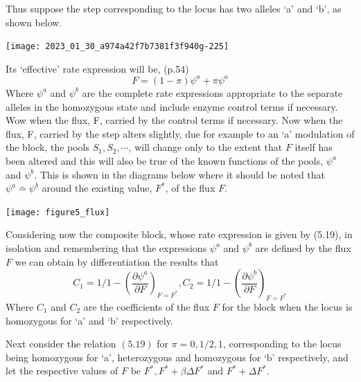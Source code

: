 Thus suppose the step corresponding to the locus has two alleles `a' and `b', as shown below.

\begin{center}
\texttt{[image: 2023\_01\_30\_a974a42f7b7381f3f940g-225]}
\end{center}

Its `effective' rate expression will be, (p.54)
%
\begin{equation}
F = (1 - \pi)\psi^a + \pi \psi^a
\label{eqn:519}
\end{equation}
%
Where $\psi^{a}$ and $\psi^{b}$ are the complete rate expressions appropriate to the separate alleles in the homozygous state and include enzyme control terms if necessary. Wow when the flux, F, carried by the control terms if necessary. Now when the flux, F, carried by the step alters slightly, due for example to an `a' modulation of the block, the pools $S_{1}, S_{2}, \cdots$, will change only to the extent that $F$ itself has been altered and this will also be true of the known functions of the pools, $\psi^{a}$ and $\psi^{b}$. This is shown in the diagrams below where it should be noted that $\psi^{a} \bumpeq \psi^{b}$ around the existing value, $F^{*}$, of the flux $F$.

\texttt{[image: figure5\_flux]}

Considering now the composite block, whose rate expression is given by (5.19), in isolation and remembering that the expressions $\psi^{a}$ and $\psi^{b}$ are defined by the flux $F$ we can obtain by differentiation the results that
%
\begin{equation}
C_{1}=1 / 1-\left(\frac{\partial \psi^{a}}{\partial F}\right)_{F=F^{*}}, C_{2}=1 / 1-\left(\frac{\partial \psi^{b}}{\partial F}\right)_{F=F^*} \tag{i}
\label{eqn:520a}
\end{equation}
%
Where $C_{1}$ and $C_{2}$ are the coefficients of the flux $F$ for the block when the locus is homozygous for `a' and `b' respectively.

Next consider the relation $(5.19)$ for $\pi=0,1 / 2,1$, corresponding to the locus being homozygous for `a', heterozygous and homozygous for `b' respectively, and let the respective values of $F$ be $F^{*}, F^{*}+\beta \Delta F^{*}$ and $F^{*}+\Delta F^{*}$.

